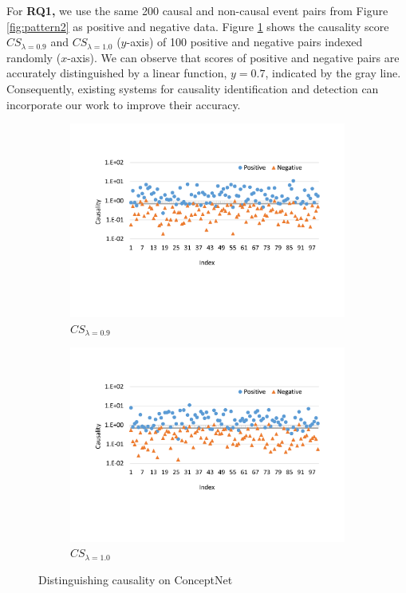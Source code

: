 \documentclass[letterpaper]{article}
\newcommand{\figref}[1]{Figure \ref{#1}}
\begin{document}
For {\bf RQ1,}
we use the same 200 causal and non-causal event pairs from
\figref{fig:pattern2} as positive and negative data.
\figref{fig:conceptApp1}
shows the causality score $CS_{\lambda=0.9}$ and $CS_{\lambda=1.0}$ ($y$-axis)
of 100 positive
and negative pairs indexed randomly ($x$-axis).
We can observe that scores
of positive and negative pairs are accurately distinguished by a
linear function, %
$y=0.7$, indicated by the gray line.
Consequently, existing systems for causality identification and detection
can incorporate our work to improve their accuracy.

\begin{figure}[ht!]
\centering
\begin{subfigure}[t]{0.9\columnwidth}
\centering
\includegraphics[width=0.9\columnwidth]{rq1-a}
\caption{$CS_{\lambda=0.9}$}
\end{subfigure}
\begin{subfigure}[t]{0.9\columnwidth}
\centering
\includegraphics[width=0.9\columnwidth]{rq1-b}
\caption{$CS_{\lambda=1.0}$}
\end{subfigure}
\caption{Distinguishing causality on ConceptNet}
\label{fig:conceptApp1}
\end{figure}
\end{document}
